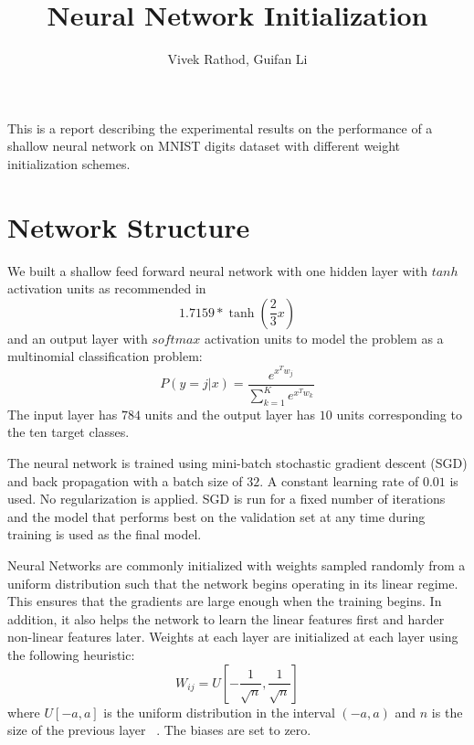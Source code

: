 \documentclass[Proceedings]{ascelike}
\begin{document}
%
\title{Neural Network Initialization}
%
\author{ Vivek Rathod, Guifan Li }
%
\maketitle
%

 This is a report describing the experimental results on the
performance of a shallow neural network on MNIST digits dataset with different
weight initialization schemes.  \section{Network Structure}
\label{sec:network_struct} We built a shallow feed forward neural network with
one hidden layer with $tanh$ activation units as recommended in
\cite{lecun2012efficient} \[1.7159*\tanh\left(\frac{2}{3}x\right)\] and an
output layer with $softmax$ activation units to model the problem as a
multinomial classification
problem:\[P(y=j|x)=\frac{e^{x^{T}w_j}}{\sum_{k=1}^Ke^{x^{T}w_k}}\] The input
layer has $784$ units and the output layer has $10$ units corresponding to the
ten target classes.

 \label{sec:train_method} The neural network is
trained using mini-batch stochastic gradient descent (SGD) and back propagation
with a batch size of $32$. A constant learning rate of $0.01$ is used. No
regularization is applied. SGD is run for a fixed number of iterations and the
model that performs best on the validation set at any time during training is
used as the final model. 

 \label{sec:weight_init} Neural Networks are
commonly initialized with weights sampled randomly from a uniform distribution
such that the network begins operating in its linear regime. This ensures that
the gradients are large enough when the training begins. In addition, it also
helps the network to learn the linear features first and harder non-linear
features later. Weights at each layer are initialized at each layer using the
following heuristic: \[W_{ij} =
U\left[-\frac{1}{\sqrt{n}},\frac{1}{\sqrt{n}}\right]\] where $U[-a, a]$ is the
uniform distribution in the interval $(-a, a)$ and $n$ is the size of the
previous layer ~\cite{erhan2009difficulty}. The biases are set to zero.
\end{document}
